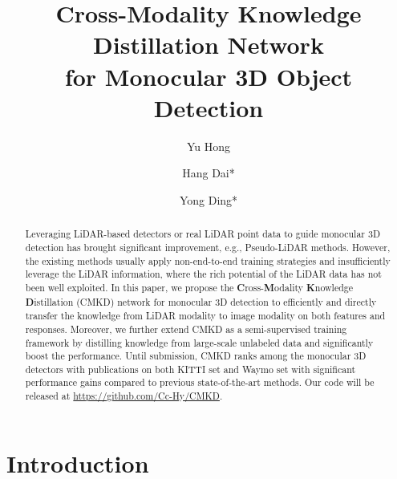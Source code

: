 \documentclass[runningheads]{llncs}
\begin{document}
\pagestyle{headings}
\mainmatter
\def\ECCVSubNumber{4878}  \title{Cross-Modality Knowledge Distillation Network \\ for Monocular 3D Object Detection}


\begin{comment}
\titlerunning{ECCV-22 submission ID \ECCVSubNumber} 
\authorrunning{ECCV-22 submission ID \ECCVSubNumber} 
\author{Anonymous ECCV submission}
\institute{Paper ID \ECCVSubNumber}
\end{comment}




\author{Yu Hong \and
Hang Dai* \and
Yong Ding*}
\maketitle
\begin{abstract}
Leveraging LiDAR-based detectors or real LiDAR point data to guide monocular 3D detection has brought significant improvement, e.g., Pseudo-LiDAR methods.
However, the existing methods usually apply non-end-to-end training strategies and insufficiently leverage the LiDAR information, where the rich potential of the LiDAR data has not been well exploited.
In this paper, we propose the \textbf{C}ross-\textbf{M}odality \textbf{K}nowledge \textbf{D}istillation (CMKD) network for monocular 3D detection to efficiently and directly transfer the knowledge from LiDAR modality to image modality on both features and responses.
Moreover, we further extend CMKD as a semi-supervised training framework by distilling knowledge from large-scale unlabeled data and significantly boost the performance.
Until submission, CMKD ranks  among the monocular 3D detectors with publications on both KITTI  set and Waymo  set with significant performance gains compared to previous state-of-the-art methods.
Our code will be released at \url{https://github.com/Cc-Hy/CMKD}.
\end{abstract}


\section{Introduction}
\end{document}
